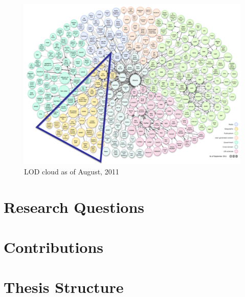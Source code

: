 \begin{figure}[ht!]
\includegraphics[scale=0.9]{img/lod-diagram-2011.png}
\caption{LOD cloud as of August, 2011}
\label{fig:lodcloud2011}
\end{figure}

\begin{figure}[ht!]
\end{figure}





\section{Research Questions}
\label{sec:questions}

\section{Contributions}
\label{sec:contributions}

\section{Thesis Structure}
\label{sec:thesis-structure}
